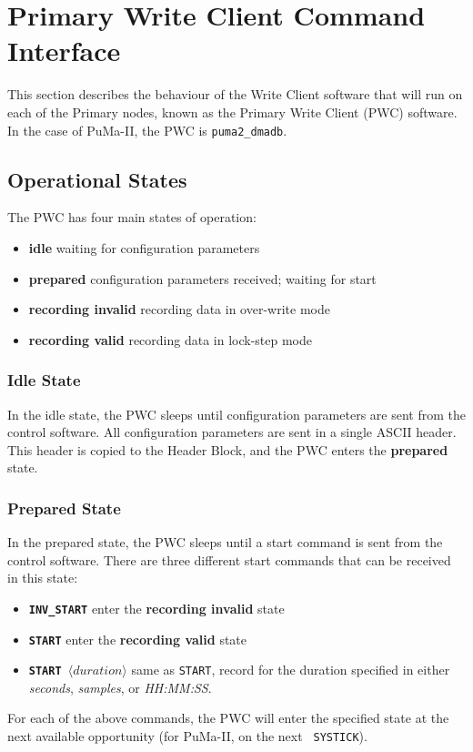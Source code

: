 \section{Primary Write Client Command Interface}
\label{sec:pwc}

This section describes the behaviour of the Write Client software that
will run on each of the Primary nodes, known as the Primary Write
Client (PWC) software.  In the case of PuMa-II, the PWC is 
{\tt puma2\_dmadb}.

\subsection{Operational States}

The PWC has four main states of operation:
\begin{itemize}
\item {\bf idle} waiting for configuration parameters
\item {\bf prepared} configuration parameters received; waiting for start
\item {\bf recording invalid} recording data in over-write mode
\item {\bf recording valid} recording data in lock-step mode
\end{itemize}

\subsubsection{Idle State}

In the idle state, the PWC sleeps until configuration parameters are
sent from the control software.  All configuration parameters are sent
in a single ASCII header.  This header is copied to the Header Block,
and the PWC enters the {\bf prepared} state.

\subsubsection{Prepared State}

In the prepared state, the PWC sleeps until a start command is sent
from the control software.  There are three different start commands
that can be received in this state:

\begin{itemize}
\item {\tt\bf INV\_START} enter the {\bf recording invalid} state
\item {\tt\bf START} enter the {\bf recording valid} state
\item {\tt\bf START $\langle duration\rangle$} same as {\tt START}, record
	for the duration specified in either {\it seconds}, {\it samples},
	or {\it HH:MM:SS}.
\end{itemize}
For each of the above commands, the PWC will enter the specified state
at the next available opportunity (for PuMa-II, on the next {\tt
SYSTICK}).

